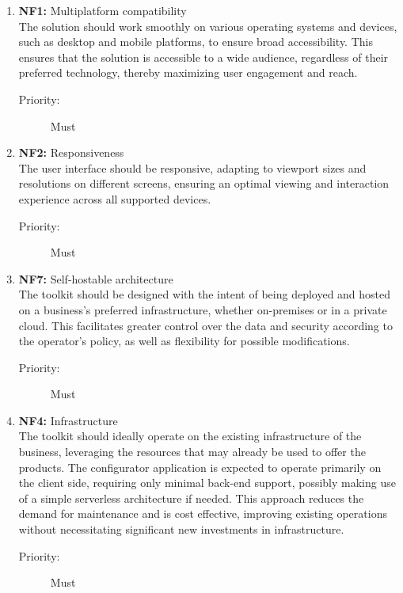 \begin{enumerate}

\item \textbf{NF1:}\label{itm:NF1} Multiplatform compatibility
\vspace{2pt}
\\The solution should work smoothly on various operating systems and devices, such as desktop and mobile platforms, to ensure broad accessibility. This ensures that the solution is accessible to a wide audience, regardless of their preferred technology, thereby maximizing user engagement and reach.
\begin{description}
    \item[Priority:] Must
\end{description}
\vspace{4pt}

\item \textbf{NF2:}\label{itm:NF2} Responsiveness
\vspace{2pt}
\\The user interface should be responsive, adapting to viewport sizes and resolutions on different screens, ensuring an optimal viewing and interaction experience across all supported devices.
\begin{description}
    \item[Priority:] Must
\end{description}
\vspace{4pt}

\item \textbf{NF7:} Self-hostable architecture
\vspace{2pt}
\\The toolkit should be designed with the intent of being deployed and hosted on a business's preferred infrastructure, whether on-premises or in a private cloud. This facilitates greater control over the data and security according to the operator's policy, as well as flexibility for possible modifications.
\begin{description}
    \item[Priority:] Must
\end{description}
\vspace{4pt}

\item \textbf{NF4:} Infrastructure
\vspace{2pt}
\\The toolkit should ideally operate on the existing infrastructure of the business, leveraging the resources that may already be used to offer the products. The configurator application is expected to operate primarily on the client side, requiring only minimal back-end support, possibly making use of a simple serverless architecture if needed. This approach reduces the demand for maintenance and is cost effective, improving existing operations without necessitating significant new investments in infrastructure.
\begin{description}
    \item[Priority:] Must
\end{description}
\vspace{4pt}


\end{enumerate}
